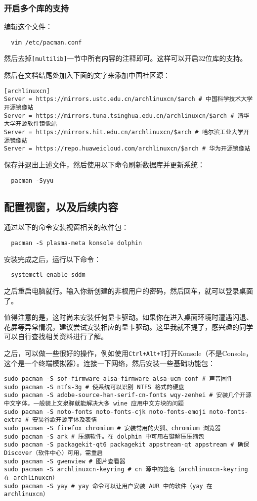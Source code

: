 \subsubsection{开启多个库的支持}

编辑这个文件：
\begin{lstlisting}
  vim /etc/pacman.conf
\end{lstlisting}
然后去掉\texttt{[multilib]}一节中所有内容的注释即可。这样可以开启32位库的支持。

然后在文档结尾处加入下面的文字来添加中国社区源：
\begin{lstlisting}
[archlinuxcn]
Server = https://mirrors.ustc.edu.cn/archlinuxcn/$arch # 中国科学技术大学开源镜像站
Server = https://mirrors.tuna.tsinghua.edu.cn/archlinuxcn/$arch # 清华大学开源软件镜像站
Server = https://mirrors.hit.edu.cn/archlinuxcn/$arch # 哈尔滨工业大学开源镜像站
Server = https://repo.huaweicloud.com/archlinuxcn/$arch # 华为开源镜像站
\end{lstlisting}

保存并退出上述文件，然后使用以下命令刷新数据库并更新系统：
\begin{lstlisting}
  pacman -Syyu
\end{lstlisting}

\subsection{配置视窗，以及后续内容}

通过以下的命令安装视窗相关的软件包：
\begin{lstlisting}
  pacman -S plasma-meta konsole dolphin
\end{lstlisting}
安装完成之后，运行以下命令：
\begin{lstlisting}
  systemctl enable sddm
\end{lstlisting}
之后重启电脑就行。输入你新创建的非根用户的密码，然后回车，就可以登录桌面了。

值得注意的是，这时尚未安装任何显卡驱动。如果你在进入桌面环境时遭遇闪退、花屏等异常情况，建议尝试安装相应的显卡驱动。这里我就不提了，感兴趣的同学可以自行查找相关资料进行了解。

之后，可以做一些很好的操作，例如使用\texttt{Ctrl+Alt+T}打开Konsole（不是Console，这个是一个终端模拟器）。连接一下网络，然后安装一些基础功能包：
\begin{lstlisting}
sudo pacman -S sof-firmware alsa-firmware alsa-ucm-conf # 声音固件
sudo pacman -S ntfs-3g # 使系统可以识别 NTFS 格式的硬盘
sudo pacman -S adobe-source-han-serif-cn-fonts wqy-zenhei # 安装几个开源中文字体。一般装上文泉驿就能解决大多 wine 应用中文方块的问题
sudo pacman -S noto-fonts noto-fonts-cjk noto-fonts-emoji noto-fonts-extra # 安装谷歌开源字体及表情
sudo pacman -S firefox chromium # 安装常用的火狐、chromium 浏览器
sudo pacman -S ark # 压缩软件。在 dolphin 中可用右键解压压缩包
sudo pacman -S packagekit-qt6 packagekit appstream-qt appstream # 确保 Discover（软件中心）可用，需重启
sudo pacman -S gwenview # 图片查看器
sudo pacman -S archlinuxcn-keyring # cn 源中的签名（archlinuxcn-keyring 在 archlinuxcn）
sudo pacman -S yay # yay 命令可以让用户安装 AUR 中的软件（yay 在 archlinuxcn）
\end{lstlisting}


